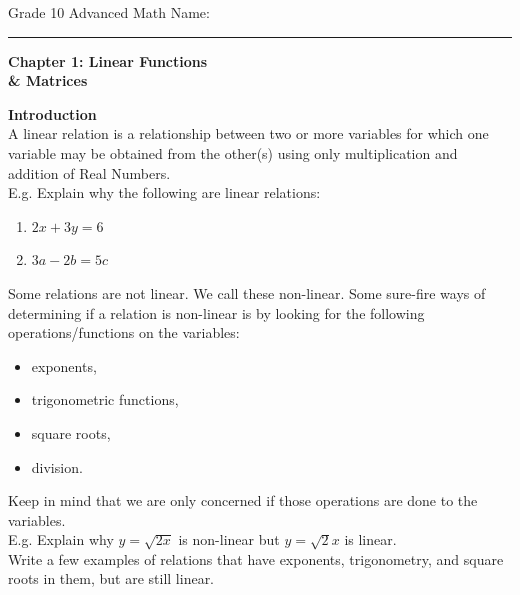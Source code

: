 \documentclass[12pt,fleqn]{book}
\begin{document}
\noindent
\thispagestyle{empty}
Grade 10 Advanced Math \hfill Name: \hspace{2in}
\medskip\hrule
\noindent

\vfill

\begin{center}
	{\bf \huge Chapter 1: Linear Functions \\ \& Matrices}
\end{center}

\vfill
\vfill

\clearpage

\setcounter{page}{1}

{\bf \huge Introduction }
\\[2em]
A linear relation is a relationship between two or more variables for which one variable may be obtained from the other(s) using only multiplication and addition of Real Numbers.
\\[1em]
E.g. Explain why the following are linear relations:
\begin{enumerate}
	\item $2x+3y = 6$
	      \vspace{1in}
	\item $3a-2b = 5c$
	      \vspace{1in}
\end{enumerate}
Some relations are not linear.  We call these non-linear.  Some sure-fire ways of determining if a relation is non-linear is by looking for the following operations/functions on the variables:
\begin{itemize}
	\item exponents,
	\item trigonometric functions,
	\item square roots,
	\item division.
\end{itemize}
Keep in mind that we are only concerned if those operations are done to the variables.
\\[1em]
E.g. Explain why $y=\sqrt{2x}$ is non-linear but $y=\sqrt 2 x$ is linear.
\\[1in]
Write a few examples of relations that have exponents, trigonometry, and square roots in them, but are still linear.
\end{document}
